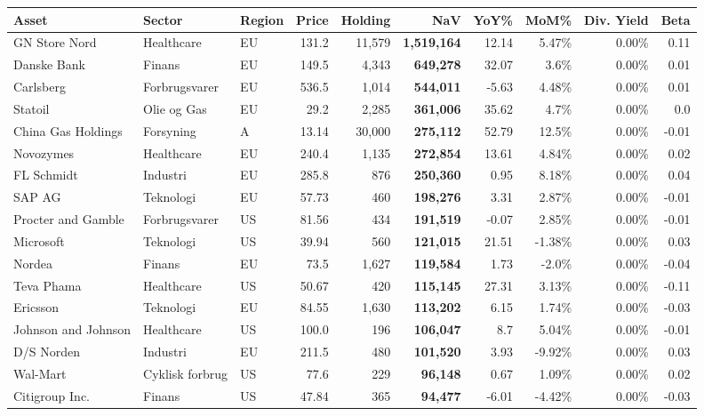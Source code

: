 \begin{tabular}{lllrrrrrrr}

\toprule

Asset & Sector & Region & Price & Holding & NaV & YoY\% & MoM\% & Div. Yield & Beta \\

\midrule

GN Store Nord & Healthcare & EU & 131.2 & 11,579 & \bf{1,519,164} & 12.14 & 5.47\% & 0.00\% & 0.11\\
Danske Bank & Finans & EU & 149.5 & 4,343 & \bf{649,278} & 32.07 & 3.6\% & 0.00\% & 0.01\\
Carlsberg & Forbrugsvarer & EU & 536.5 & 1,014 & \bf{544,011} & -5.63 & 4.48\% & 0.00\% & 0.01\\
Statoil & Olie og Gas & EU & 29.2 & 2,285 & \bf{361,006} & 35.62 & 4.7\% & 0.00\% & 0.0\\
China Gas Holdings & Forsyning & A & 13.14 & 30,000 & \bf{275,112} & 52.79 & 12.5\% & 0.00\% & -0.01\\
Novozymes & Healthcare & EU & 240.4 & 1,135 & \bf{272,854} & 13.61 & 4.84\% & 0.00\% & 0.02\\
FL Schmidt & Industri & EU & 285.8 & 876 & \bf{250,360} & 0.95 & 8.18\% & 0.00\% & 0.04\\
SAP AG & Teknologi & EU & 57.73 & 460 & \bf{198,276} & 3.31 & 2.87\% & 0.00\% & -0.01\\
Procter and Gamble & Forbrugsvarer & US & 81.56 & 434 & \bf{191,519} & -0.07 & 2.85\% & 0.00\% & -0.01\\
Microsoft & Teknologi & US & 39.94 & 560 & \bf{121,015} & 21.51 & -1.38\% & 0.00\% & 0.03\\
Nordea & Finans & EU & 73.5 & 1,627 & \bf{119,584} & 1.73 & -2.0\% & 0.00\% & -0.04\\
Teva Phama & Healthcare & US & 50.67 & 420 & \bf{115,145} & 27.31 & 3.13\% & 0.00\% & -0.11\\
Ericsson & Teknologi & EU & 84.55 & 1,630 & \bf{113,202} & 6.15 & 1.74\% & 0.00\% & -0.03\\
Johnson and Johnson & Healthcare & US & 100.0 & 196 & \bf{106,047} & 8.7 & 5.04\% & 0.00\% & -0.01\\
D/S Norden & Industri & EU & 211.5 & 480 & \bf{101,520} & 3.93 & -9.92\% & 0.00\% & 0.03\\
Wal-Mart & Cyklisk forbrug & US & 77.6 & 229 & \bf{96,148} & 0.67 & 1.09\% & 0.00\% & 0.02\\
Citigroup Inc. & Finans & US & 47.84 & 365 & \bf{94,477} & -6.01 & -4.42\% & 0.00\% & -0.03\\

\end{tabular}
